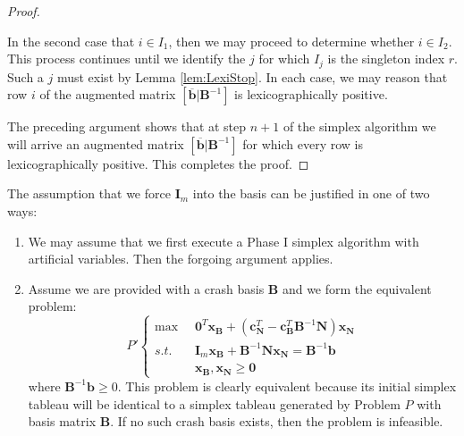 \begin{proof}
\begin{description}
In the second case that $i \in I_1$, then we may proceed to determine whether $i \in I_2$. This process continues until we identify the $j$ for which $I_j$ is the singleton index $r$. Such a $j$ must exist by Lemma \ref{lem:LexiStop}. In each case, we may reason that row $i$ of the augmented matrix $[\overline{\mathbf{b}} | \mathbf{B}^{-1}]$ is lexicographically positive.
\end{description}

The preceding argument shows that at step $n+1$ of the simplex algorithm we will arrive an augmented matrix $[\overline{\mathbf{b}} | \mathbf{B}^{-1}]$ for which every row is lexicographically positive. This completes the proof.
\end{proof}

\begin{remark} The assumption that we force $\mathbf{I}_m$ into the basis can be justified in one of two ways:
\begin{enumerate}
\item We may assume that we first execute a Phase I simplex algorithm with artificial variables. Then the forgoing argument applies. 

\item Assume we are provided with a crash basis $\mathbf{B}$ and we form the equivalent problem:
\begin{displaymath}
P'\left\{
\begin{aligned}
\max\;\; & \mathbf{0}^T\mathbf{x}_\mathbf{B} + 
(\mathbf{c}_\mathbf{N}^T - \mathbf{c}_\mathbf{B}^T\mathbf{B}^{-1}\mathbf{N})\mathbf{x}_\mathbf{N}\\
s.t.\;\;&\mathbf{I}_m\mathbf{x}_\mathbf{B} + \mathbf{B}^{-1}\mathbf{N}\mathbf{x}_\mathbf{N} = \mathbf{B}^{-1}\mathbf{b}\\
& \mathbf{x}_\mathbf{B},\mathbf{x}_\mathbf{N} \geq \mathbf{0}
\end{aligned}
\right.
\end{displaymath}
where $\mathbf{B}^{-1}\mathbf{b} \geq 0$. This problem is clearly equivalent because its initial simplex tableau will be identical to a simplex tableau generated by Problem $P$ with basis matrix $\mathbf{B}$. If no such crash basis exists, then the problem is infeasible. 
\end{enumerate}
\end{remark}

